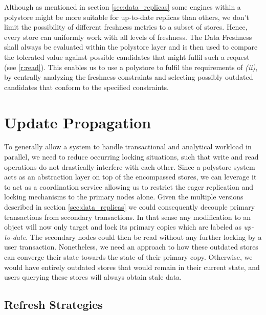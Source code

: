 Although as mentioned in section \ref{sec:data_replicas} some engines within a polystore might be more suitable for up-to-date replicas than others,
we don't limit the possibility of different freshness metrics to a subset of stores. Hence, every store can uniformly work with all levels of freshness.
The Data Freshness shall always be evaluated within the polystore layer and is then used to compare the tolerated value against possible candidates that might fulfil such a request 
(see \ref{r:read}). This enables us to use a polystore to fulfil the requirements of \textit{(ii)}, by centrally analyzing the freshness constraints and selecting possibly outdated 
candidates that conform to the specified constraints.







\section{Update Propagation}
\label{sec:propagation}

To generally allow a system to handle transactional and analytical workload in parallel, we need to reduce occurring locking situations,
such that write and read operations do not drastically interfere with each other.
Since a polystore system acts as an abstraction layer on top of the encompassed stores, we can leverage it to act as a coordination service 
allowing us to restrict the eager replication and locking mechanisms to the primary nodes alone.
Given the multiple versions described in section \ref{sec:data_replicas} we could consequently decouple primary transactions from 
secondary transactions. In that sense any modification to an object will now only target and lock its primary copies which are labeled as \emph{up-to-date}.
The secondary nodes could then be read without any further locking by a user transaction. 
Nonetheless, we need an approach to how these outdated stores can converge their state towards the state of their primary copy.
Otherwise, we would have entirely outdated stores that would remain in their current state, and users querying these stores will always obtain stale data. 


\subsection{Refresh Strategies}
\label{sec:refresh_strategies}

